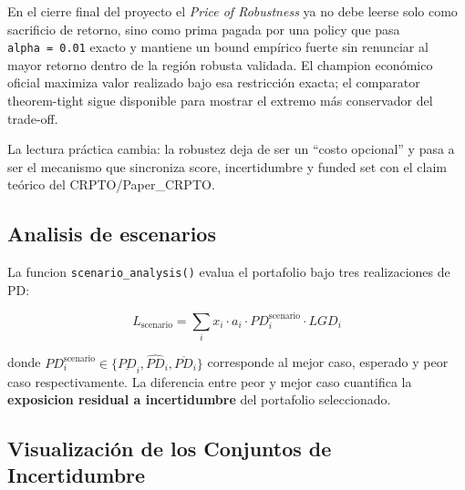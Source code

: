 \documentclass[
  spanish,
  11pt,
  letterpaper,
]{scrbook}
\theoremstyle{plain}
\theoremstyle{remark}
\begin{document}
\begin{tcolorbox}[enhanced jigsaw, arc=.35mm, bottomrule=.15mm, bottomtitle=1mm, breakable, colback=white, colbacktitle=quarto-callout-tip-color!10!white, colframe=quarto-callout-tip-color-frame, coltitle=black, left=2mm, leftrule=.75mm, opacityback=0, opacitybacktitle=0.6, rightrule=.15mm, title=\textcolor{quarto-callout-tip-color}{\faLightbulb}\hspace{0.5em}{Precio de la robustez como prima de defendibilidad}, titlerule=0mm, toprule=.15mm, toptitle=1mm]

En el cierre final del proyecto el \emph{Price of Robustness} ya no debe
leerse solo como sacrificio de retorno, sino como prima pagada por una
policy que pasa \texttt{alpha\ =\ 0.01} exacto y mantiene un bound
empírico fuerte sin renunciar al mayor retorno dentro de la región
robusta validada. El champion económico oficial maximiza valor realizado
bajo esa restricción exacta; el comparator theorem-tight sigue
disponible para mostrar el extremo más conservador del trade-off.

La lectura práctica cambia: la robustez deja de ser un ``costo
opcional'' y pasa a ser el mecanismo que sincroniza score, incertidumbre
y funded set con el claim teórico del CRPTO/Paper\_CRPTO.

\end{tcolorbox}

\subsection{Analisis de escenarios}\label{analisis-de-escenarios}

La funcion \texttt{scenario\_analysis()} evalua el portafolio bajo tres
realizaciones de PD:

\[
L_{\text{scenario}} = \sum_i x_i \cdot a_i \cdot PD_i^{\text{scenario}} \cdot LGD_i
\]

donde
\(PD_i^{\text{scenario}} \in \{\underline{PD}_i, \widehat{PD}_i, \overline{PD}_i\}\)
corresponde al mejor caso, esperado y peor caso respectivamente. La
diferencia entre peor y mejor caso cuantifica la \textbf{exposicion
residual a incertidumbre} del portafolio seleccionado.

\subsection{Visualización de los Conjuntos de
Incertidumbre}\label{visualizaciuxf3n-de-los-conjuntos-de-incertidumbre}
\end{document}
